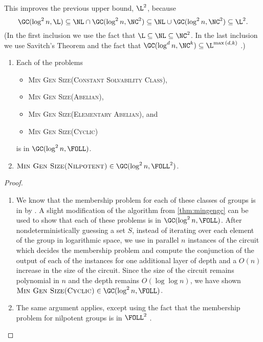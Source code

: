 \documentclass{article}
\begin{document}
This improves the previous upper bound, $\L^2$, because
\begin{equation*}
  \GC(\log^2 n, \L) \subseteq \NL \cap \GC(\log^2 n, \NC^2) \subseteq \NL \cup \GC(\log^2 n, \NC^2) \subseteq \L^2.
\end{equation*}
(In the first inclusion we use the fact that $\L \subseteq \NL \subseteq \NC^2$.
In the last inclusion we use Savitch's Theorem and the fact that $\GC(\log^d n, \NC^k) \subseteq \L^{\max{(d, k)}}$ \cite[Lemma~3.1]{wolf94}.)

\begin{theorem}
  \mbox{}
  \begin{enumerate}
  \item Each of the problems
    \begin{itemize}
    \item \textsc{Min Gen Size(Constant Solvability Class)},
    \item \textsc{Min Gen Size(Abelian)},
    \item \textsc{Min Gen Size(Elementary Abelian)}, and
    \item \textsc{Min Gen Size(Cyclic)}
    \end{itemize}
    is in $\GC(\log^2 n, \FOLL)$.
  \item $\textsc{Min Gen Size(Nilpotent)} \in \GC(\log^2 n, \FOLL^2)$.
  \end{enumerate}
\end{theorem}
\begin{proof}
  \mbox{}
  \begin{enumerate}
  \item
    We know that the membership problem for each of these classes of groups is in \FOLL{} by \cite[Section~3]{bklm01}.
    A slight modification of the algorithm from \autoref{thm:mingengc} can be used to show that each of these problems is in $\GC(\log^2 n, \FOLL)$.
    After nondeterministically guessing a set $S$, instead of iterating over each element of the group in logarithmic space, we use in parallel $n$ instances of the \FOLL{} circuit which decides the membership problem and compute the conjunction of the output of each of the instances for one additional layer of depth and a $O(n)$ increase in the size of the circuit.
    Since the size of the circuit remains polynomial in $n$ and the depth remains $O(\log \log n)$, we have shown $\textsc{Min Gen Size(Cyclic)} \in \GC(\log^2 n, \FOLL)$.
  \item The same argument applies, except using the fact that the membership problem for nilpotent groups is in $\FOLL^2$ \cite[Corollary~3.12]{bklm01}. \qedhere
  \end{enumerate}
\end{proof}
\end{document}

